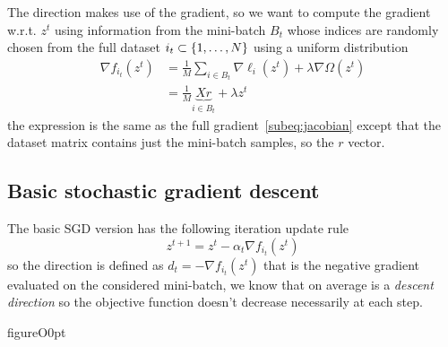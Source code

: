 The direction makes use of the gradient, so we want to compute the gradient w.r.t. $z^t$ using information from the mini-batch $B_t$ whose indices are randomly chosen from the full dataset $i_t\subset\{1,\dots,N\}$ using a uniform distribution%
\begin{equation}\label{eq:mini-grad}
\begin{split}
\nabla f_{i_t}(z^t) &= \frac{1}{M}\sum_{i\in B_t}\nabla \ell_i(z^t)+\lambda\nabla\Omega(z^t) \\
 &= \frac{1}{M}\underbrace{Xr}_{i\in B_t}+\lambda z^t
\end{split}
\end{equation}
the expression is the same as the full gradient~\eqref{subeq:jacobian} except that the dataset matrix contains just the mini-batch samples, so the $r$ vector.




\subsection{Basic stochastic gradient descent}\label{subsc:sgd}

The basic SGD version has the following iteration update rule
\begin{equation}\label{eq:sgd-base}
z^{t+1}=z^t-\alpha_t\nabla f_{i_t}(z^t)
\end{equation}
so the direction is defined as $d_t=-\nabla f_{i_t}(z^t)$ that is the negative gradient evaluated on the considered mini-batch, we know that on average is a \emph{descent direction} so the objective function doesn't decrease necessarily at each step.\pagebreak

\begin{wrapfloat}{figure}{O}{0pt}
\end{wrapfloat}

